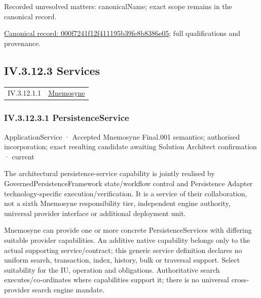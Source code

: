 {\small Recorded unresolved matters: canonicalName; exact scope remains in the canonical record.}\par
{\footnotesize \href{../../../../../../../continuum/application/application-function/000f7241f12f411195b39fe8b8386e05.md}{Canonical record: 000f7241f12f411195b39fe8b8386e05}; full qualifications and provenance.}\par
\subsection*{IV.3.12.3 Services}
\label{navigation:IV.3.12.3}

\begin{longtable}{p{.22\linewidth}p{.73\linewidth}}
IV.3.12.1.1 & \hyperref[element:7985e647bf9e4ca3ba70faf9e3e4ae02]{Mnemosyne} \\
\end{longtable}
\subsubsection*{IV.3.12.3.1 PersistenceService}
\label{navigation:IV.3.12.3.1}

\label{element:c050edfefe8b4d2b8892bc94b2d27a5c}
{\small ApplicationService · Accepted Mnemosyne Final.001 semantics; authorised incorporation; exact resulting candidate awaiting Solution Architect confirmation · current}\par

The architectural persistence-service capability is jointly realised by GovernedPersistenceFramework state/workflow control and Persistence Adapter technology-specific execution/verification. It is a service of their collaboration, not a sixth Mnemosyne responsibility tier, independent engine authority, universal provider interface or additional deployment unit.



Mnemosyne can provide one or more concrete PersistenceServices with differing suitable provider capabilities. An additive native capability belongs only to the actual supporting service/contract; this generic service definition declares no uniform search, transaction, index, history, bulk or traversal support. Select suitability for the IU, operation and obligations. Authoritative search executes/co-ordinates where capabilities support it; there is no universal cross-provider search engine mandate.



